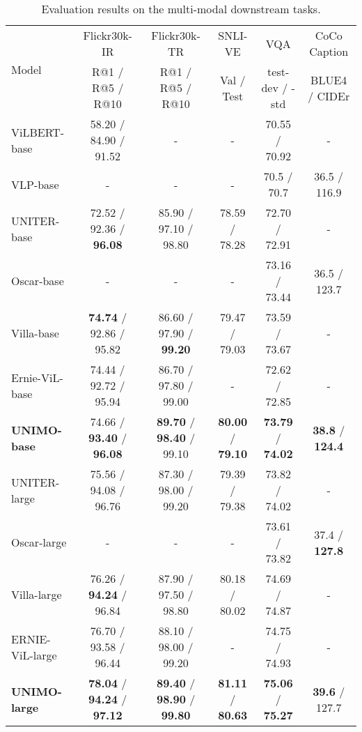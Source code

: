 \documentclass[11pt,a4paper]{article}
\begin{document}
\begin{table*}[ht!]
\centering
\small
\begin{tabular}{l c c c c c}
\hline \hline
\multirow{2}{*}{Model} & Flickr30k-IR & Flickr30k-TR & SNLI-VE & VQA & CoCo Caption  \\
& R@1 / R@5 / R@10 & R@1 / R@5 / R@10 & Val / Test & test-dev / -std  & BLUE4 / CIDEr \\
\hline
ViLBERT-base & 58.20 / 84.90 / 91.52 & - & - & 70.55 / 70.92 & -  \\
VLP-base & - & - & - & 70.5 / 70.7 & 36.5 / 116.9  \\
UNITER-base & 72.52 / 92.36 / \textbf{96.08} & 85.90 / 97.10 / 98.80 & 78.59 / 78.28 & 72.70 / 72.91 & -   \\
Oscar-base & - & - & - & 73.16 / 73.44 & 36.5 / 123.7  \\
Villa-base & \textbf{74.74} / 92.86 / 95.82 & 86.60 / 97.90 / \textbf{99.20} & 79.47 / 79.03 & 73.59 / 73.67 & -  \\
Ernie-ViL-base & 74.44 / 92.72 / 95.94 & 86.70 / 97.80 / 99.00 & - & 72.62 / 72.85 &  -   \\
\textbf{UNIMO-base} & 74.66 / \textbf{93.40} / \textbf{96.08} & \textbf{89.70} / \textbf{98.40} / 99.10 & \textbf{80.00} / \textbf{79.10} & \textbf{73.79} / \textbf{74.02} & \textbf{38.8} / \textbf{124.4}  \\
\hline
UNITER-large & 75.56 / 94.08 / 96.76 & 87.30 / 98.00 / 99.20 & 79.39 / 79.38 & 73.82 / 74.02 &  -   \\
Oscar-large & - & - & - & 73.61 / 73.82 & 37.4 / \textbf{127.8}  \\
Villa-large & 76.26 / \textbf{94.24} / 96.84 & 87.90 / 97.50 / 98.80 & 80.18 / 80.02 & 74.69 / 74.87 & - \\
ERNIE-ViL-large & 76.70 / 93.58 / 96.44 & 88.10 / 98.00 / 99.20 &  - & 74.75 / 74.93 & -  \\
\textbf{UNIMO-large} & \textbf{78.04} / \textbf{94.24} / \textbf{97.12} & \textbf{89.40} / \textbf{98.90} / \textbf{99.80} & \textbf{81.11} / \textbf{80.63} & \textbf{75.06} / \textbf{75.27} & \textbf{39.6} / 127.7 \\
\hline
 \hline
\end{tabular}
\caption{\label{multi-modal}
Evaluation results on the multi-modal downstream tasks.}
\end{table*}
\end{document}
